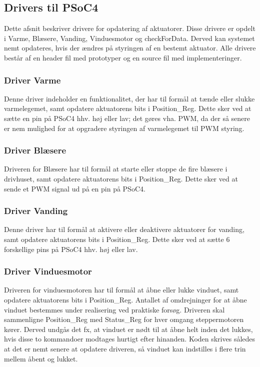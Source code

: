 \clearpage


\subsection{Drivers til PSoC4}
Dette afsnit beskriver drivere for opdatering af aktuatorer. 
Disse drivere er opdelt i Varme, Blæsere, Vanding, Vinduesmotor og checkForData. 
Derved kan systemet nemt opdateres, hvis der ændres på styringen af en bestemt aktuator. 
Alle drivere består af en header fil med prototyper og en source fil med implementeringer.

\subsubsection{Driver Varme}
Denne driver indeholder en funktionalitet, der har til formål at tænde eller slukke varmelegemet, samt opdatere aktuatorens bits i Position\_Reg. 
Dette sker ved at sætte en pin på PSoC4 hhv. høj eller lav; det gøres vha. PWM, da der så senere er nem mulighed for at opgradere styringen af varmelegemet til PWM styring. 

\subsubsection{Driver Blæsere}
Driveren for Blæsere har til formål at starte eller stoppe de fire blæsere i drivhuset, samt opdatere aktuatorens bits i Position\_Reg.
Dette sker ved at sende et PWM signal ud på en pin på PSoC4. 

\subsubsection{Driver Vanding}
Denne driver har til formål at aktivere eller deaktivere aktuatorer for vanding, samt opdatere aktuatorens bits i Position\_Reg. 
Dette sker ved at sætte 6 forskellige pins på PSoC4 hhv. høj eller lav. 

\subsubsection{Driver Vinduesmotor}
Driveren for vinduesmotoren har til formål at åbne eller lukke vinduet, samt opdatere aktuatorens bits i Position\_Reg. 
Antallet af omdrejninger for at åbne vinduet bestemmes under realisering ved praktiske forsøg. 
Driveren skal sammenligne Position\_Reg med Status\_Reg for hver omgang steppermotoren kører. 
Derved undgås det fx, at vinduet er nødt til at åbne helt inden det lukkes, hvis disse to kommandoer modtages hurtigt efter hinanden. 
Koden skrives således at det er nemt senere at opdatere driveren, så vinduet kan indstilles i flere trin mellem åbent og lukket. 

